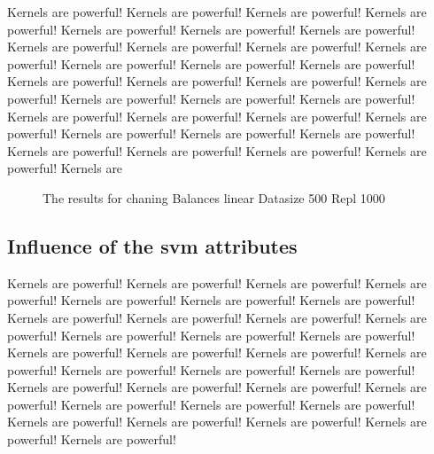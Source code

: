\documentclass[letterpaper]{article}
\begin{document}
 Kernels are powerful! Kernels are powerful! Kernels are powerful! Kernels are powerful! Kernels are powerful! Kernels are powerful! Kernels are powerful! Kernels are powerful! Kernels are powerful! Kernels are powerful! Kernels are powerful! Kernels are powerful! Kernels are powerful! Kernels are powerful! Kernels are powerful! Kernels are powerful! Kernels are powerful! Kernels are powerful! Kernels are powerful! Kernels are powerful! Kernels are powerful! Kernels are powerful! Kernels are powerful! Kernels are powerful! Kernels are powerful! Kernels are powerful! Kernels are powerful! Kernels are powerful! Kernels are powerful! Kernels are powerful! Kernels are powerful! Kernels are powerful! Kernels are 

\begin{figure}[!htb]
\begin{center}

\caption{The results for chaning Balances linear Datasize 500 Repl 1000}
\label{fig1}
\end{center}
\end{figure}


\subsection{Influence of the svm attributes}
 Kernels are powerful! Kernels are powerful! Kernels are powerful! Kernels are powerful! Kernels are powerful! Kernels are powerful! Kernels are powerful! Kernels are powerful! Kernels are powerful! Kernels are powerful! Kernels are powerful! Kernels are powerful! Kernels are powerful! Kernels are powerful! Kernels are powerful! Kernels are powerful! Kernels are powerful! Kernels are powerful! Kernels are powerful! Kernels are powerful! Kernels are powerful! Kernels are powerful! Kernels are powerful! Kernels are powerful! Kernels are powerful! Kernels are powerful! Kernels are powerful! Kernels are powerful! Kernels are powerful! Kernels are powerful! Kernels are powerful! Kernels are powerful! Kernels are powerful! 
\end{document}
